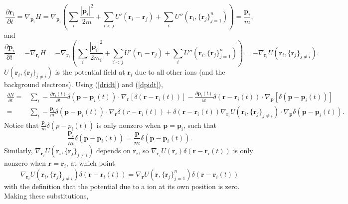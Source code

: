 \documentclass{article}
\begin{document}
\begin{equation}
\frac{\partial \mathbf{r}_i}{\partial t}=\nabla_{\mathbf{p}_i}H=\nabla_{\mathbf{p}_i}\left(\sum_i \frac{|\mathbf{p}_i|^2}{2m}+\sum_{i<j}U'(\mathbf{r}_i-\mathbf{r}_j)+\sum_i U''\left(\mathbf{r}_i,\{\mathbf{r}_j\}_{j=1}^n\right)\right)=\frac{\mathbf{p}_i}{m}\label{dridt},
\end{equation}and
\begin{equation}
\frac{\partial \mathbf{p}_i}{\partial t}=-\nabla_{\mathbf{r}_i}H=-\nabla_{\mathbf{r}_i}\left(\sum_i \frac{|\mathbf{p}_i|^2}{2m_i}+\sum_{i<j}U'(\mathbf{r}_i-\mathbf{r}_j)+\sum_i U''\left(\mathbf{r}_i,\{\mathbf{r}_j\}_{j=1}^n\right)\right)=-\nabla_{\mathbf{r}_i} U\left(\mathbf{r}_i,\{\mathbf{r}_j\}_{j\neq i}\right).\label{dpidt}
\end{equation}$U\left(\mathbf{r}_i,\{\mathbf{r}_j\}_{j\neq i}\right)$ is the potential field at $\mathbf{r}_i$ due to all other ions (and the background electrons). Using (\ref{dridt}) and (\ref{dpidt}),
\begin{align*}
\frac{\partial N}{\partial t}=&\sum_i-\frac{\partial \mathbf{r}_i(t)}{\partial t}\delta(\mathbf{p}-\mathbf{p}_i(t))\cdot \nabla_\mathbf{r}[\delta(\mathbf{r}-\mathbf{r}_i(t))]-\frac{\partial \mathbf{p}_i(t)}{\partial t}\delta(\mathbf{r}-\mathbf{r}_i(t))\cdot \nabla_\mathbf{p}[\delta(\mathbf{p}-\mathbf{p}_i(t))]\\
=&\sum_i-\frac{\mathbf{p}_i}{m}\delta(\mathbf{p}-\mathbf{p}_i(t))\cdot\nabla_\mathbf{r}\delta(r-\mathbf{r}_i(t))+\delta(\mathbf{r}-\mathbf{r}_i(t))\nabla_{\mathbf{r}_i}U\left(\mathbf{r}_i,\{\mathbf{r}_j\}_{j\neq i}\right)\cdot \nabla_\mathbf{p}\delta(\mathbf{p}-\mathbf{p}_i(t)).
\end{align*}
Notice that $\frac{\mathbf{p}_i}{m}\delta(p-p_i(t))$ is only nonzero when $\mathbf{p}=\mathbf{p}_i$, such that 
\begin{equation*}\frac{\mathbf{p}_i}{m}\delta(\mathbf{p}-\mathbf{p}_i(t))=\frac{\mathbf{p}}{m}\delta(\mathbf{p}-\mathbf{p}_i(t)).\end{equation*} 
Similarly, $\nabla_{\mathbf{r}_i}U\left(\mathbf{r}_i,\{\mathbf{r}_j\}_{j\neq i}\right)$ depends on $\mathbf{r}_i$, so $\nabla_{\mathbf{r}_i}U(\mathbf{r}_i)\delta(\mathbf{r}-\mathbf{r}_i(t))$ is only nonzero when $\mathbf{r}=\mathbf{r}_i$, at which point \begin{equation*}\nabla_{\mathbf{r}_i}U\left(\mathbf{r}_i,\{\mathbf{r}_j\}_{j\neq i}\right)\delta(\mathbf{r}-\mathbf{r}_i(t))=\nabla_\mathbf{r}U\left(\mathbf{r},\{\mathbf{r}_j\}_{j=1}^n\right)\delta(\mathbf{r}-\mathbf{r}_i(t))\end{equation*}with the definition that the potential due to a ion at its own position is zero. Making these substitutions,
\end{document}
